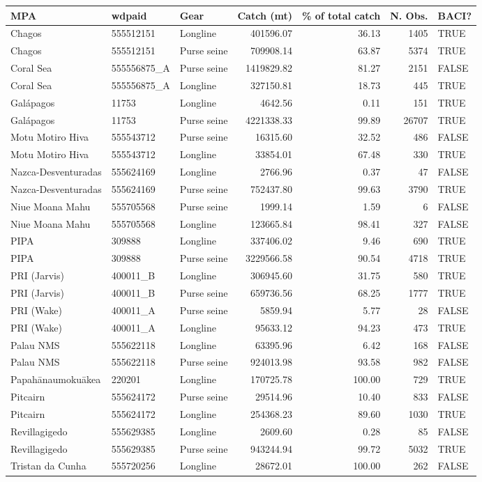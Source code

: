 \begin{table}
\centering
\begin{tabular}{lllrrrl}
\toprule
MPA & wdpaid & Gear & Catch (mt) & \% of total catch & N. Obs. & BACI?\\
\midrule
Chagos & 555512151 & Longline & 401596.07 & 36.13 & 1405 & TRUE\\
Chagos & 555512151 & Purse seine & 709908.14 & 63.87 & 5374 & TRUE\\
Coral Sea & 555556875\_A & Purse seine & 1419829.82 & 81.27 & 2151 & FALSE\\
Coral Sea & 555556875\_A & Longline & 327150.81 & 18.73 & 445 & TRUE\\
Galápagos & 11753 & Longline & 4642.56 & 0.11 & 151 & TRUE\\
\addlinespace
Galápagos & 11753 & Purse seine & 4221338.33 & 99.89 & 26707 & TRUE\\
Motu Motiro Hiva & 555543712 & Purse seine & 16315.60 & 32.52 & 486 & FALSE\\
Motu Motiro Hiva & 555543712 & Longline & 33854.01 & 67.48 & 330 & TRUE\\
Nazca-Desventuradas & 555624169 & Longline & 2766.96 & 0.37 & 47 & FALSE\\
Nazca-Desventuradas & 555624169 & Purse seine & 752437.80 & 99.63 & 3790 & TRUE\\
\addlinespace
Niue Moana Mahu & 555705568 & Purse seine & 1999.14 & 1.59 & 6 & FALSE\\
Niue Moana Mahu & 555705568 & Longline & 123665.84 & 98.41 & 327 & FALSE\\
PIPA & 309888 & Longline & 337406.02 & 9.46 & 690 & TRUE\\
PIPA & 309888 & Purse seine & 3229566.58 & 90.54 & 4718 & TRUE\\
PRI (Jarvis) & 400011\_B & Longline & 306945.60 & 31.75 & 580 & TRUE\\
\addlinespace
PRI (Jarvis) & 400011\_B & Purse seine & 659736.56 & 68.25 & 1777 & TRUE\\
PRI (Wake) & 400011\_A & Purse seine & 5859.94 & 5.77 & 28 & FALSE\\
PRI (Wake) & 400011\_A & Longline & 95633.12 & 94.23 & 473 & TRUE\\
Palau NMS & 555622118 & Longline & 63395.96 & 6.42 & 168 & FALSE\\
Palau NMS & 555622118 & Purse seine & 924013.98 & 93.58 & 982 & FALSE\\
\addlinespace
Papahānaumokuākea & 220201 & Longline & 170725.78 & 100.00 & 729 & TRUE\\
Pitcairn & 555624172 & Purse seine & 29514.96 & 10.40 & 833 & FALSE\\
Pitcairn & 555624172 & Longline & 254368.23 & 89.60 & 1030 & TRUE\\
Revillagigedo & 555629385 & Longline & 2609.60 & 0.28 & 85 & FALSE\\
Revillagigedo & 555629385 & Purse seine & 943244.94 & 99.72 & 5032 & TRUE\\
\addlinespace
Tristan da Cunha & 555720256 & Longline & 28672.01 & 100.00 & 262 & FALSE\\
\bottomrule
\end{tabular}
\end{table}
